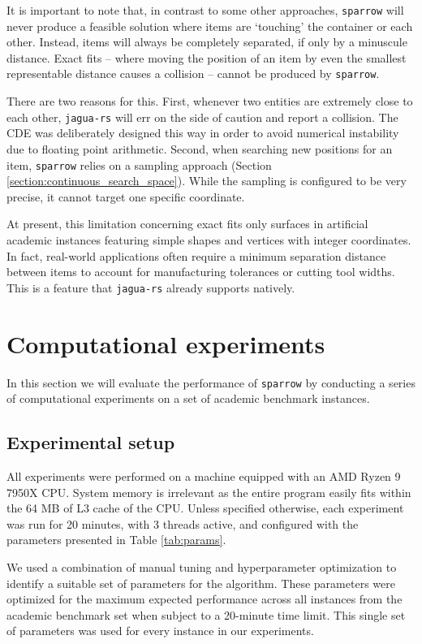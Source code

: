 \documentclass[preprint, 11pt, authoryear]{elsarticle}
\begin{document}
It is important to note that, in contrast to some other approaches, \texttt{sparrow} will never produce a feasible solution where items are `touching' the container or each other.
Instead, items will always be completely separated, if only by a minuscule distance. 
Exact fits -- where moving the position of an item by even the smallest representable distance causes a collision -- cannot be produced by \texttt{sparrow}.

There are two reasons for this.
First, whenever two entities are extremely close to each other, \texttt{jagua-rs} will err on the side of caution and report a collision.
The CDE was deliberately designed this way in order to avoid numerical instability due to floating point arithmetic.
Second, when searching new positions for an item, \texttt{sparrow} relies on a sampling approach (Section \ref{section:continuous_search_space}).
While the sampling is configured to be very precise, it cannot target one specific coordinate.

At present, this limitation concerning exact fits only surfaces in artificial academic instances featuring simple shapes and vertices with integer coordinates.
In fact, real-world applications often require a minimum separation distance between items to account for manufacturing tolerances or cutting tool widths. This is a feature that \texttt{jagua-rs} already supports natively.

\section{Computational experiments} \label{section:experiments}
In this section we will evaluate the performance of \texttt{sparrow} by conducting a series of computational experiments on a set of academic benchmark instances.

\subsection{Experimental setup} \label{section:experimental_setup}
All experiments were performed on a machine equipped with an AMD Ryzen{\texttrademark} 9 7950X CPU. 
System memory is irrelevant as the entire program easily fits within the 64 MB of L3 cache of the CPU. 
Unless specified otherwise, each experiment was run for 20 minutes, with 3 threads active, and configured with the parameters presented in Table \ref{tab:params}.



We used a combination of manual tuning and hyperparameter optimization \citep{bergstra2013making} to identify a suitable set of parameters for the algorithm.
These parameters were optimized for the maximum expected performance across all instances from the academic benchmark set when subject to a 20-minute time limit.
This single set of parameters was used for every instance in our experiments.
\end{document}
